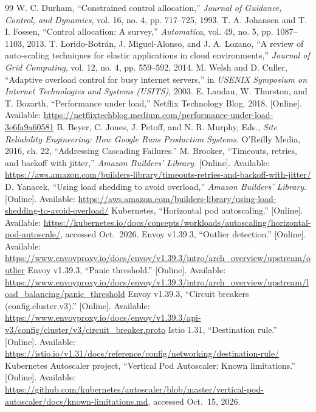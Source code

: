 \documentclass[conference]{IEEEtran}
\begin{document}
\begin{thebibliography}{99}
 W. C. Durham, ``Constrained control allocation,'' \emph{Journal of Guidance, Control, and Dynamics}, vol. 16, no. 4, pp. 717--725, 1993.
 T. A. Johansen and T. I. Fossen, ``Control allocation: A survey,'' \emph{Automatica}, vol. 49, no. 5, pp. 1087--1103, 2013.
 T. Lorido-Botr\'an, J. Miguel-Alonso, and J. A. Lozano, ``A review of auto-scaling techniques for elastic applications in cloud environments,'' \emph{Journal of Grid Computing}, vol. 12, no. 4, pp. 559--592, 2014.
 M. Welsh and D. Culler, ``Adaptive overload control for busy internet servers,'' in \emph{USENIX Symposium on Internet Technologies and Systems (USITS)}, 2003.
 E. Landau, W. Thurston, and T. Bozarth, ``Performance under load,'' Netflix Technology Blog, 2018. [Online]. Available: \url{https://netflixtechblog.medium.com/performance-under-load-3e6fa9a60581}
 B. Beyer, C. Jones, J. Petoff, and N. R. Murphy, Eds., \emph{Site Reliability Engineering: How Google Runs Production Systems}. O'Reilly Media, 2016, ch. 22, ``Addressing Cascading Failures.''
 M. Brooker, ``Timeouts, retries, and backoff with jitter,'' \emph{Amazon Builders' Library}. [Online]. Available: \url{https://aws.amazon.com/builders-library/timeouts-retries-and-backoff-with-jitter/}
 D. Yanacek, ``Using load shedding to avoid overload,'' \emph{Amazon Builders' Library}. [Online]. Available: \url{https://aws.amazon.com/builders-library/using-load-shedding-to-avoid-overload/}
 Kubernetes, ``Horizontal pod autoscaling.'' [Online]. Available: \url{https://kubernetes.io/docs/concepts/workloads/autoscaling/horizontal-pod-autoscale/}, accessed Oct.\ 2026.
 Envoy v1.39.3, ``Outlier detection.'' [Online]. Available: \url{https://www.envoyproxy.io/docs/envoy/v1.39.3/intro/arch_overview/upstream/outlier}
 Envoy v1.39.3, ``Panic threshold.'' [Online]. Available: \url{https://www.envoyproxy.io/docs/envoy/v1.39.3/intro/arch_overview/upstream/load_balancing/panic_threshold}
 Envoy v1.39.3, ``Circuit breakers (config.cluster.v3).'' [Online]. Available: \url{https://www.envoyproxy.io/docs/envoy/v1.39.3/api-v3/config/cluster/v3/circuit_breaker.proto}
 Istio 1.31, ``Destination rule.'' [Online]. Available: \url{https://istio.io/v1.31/docs/reference/config/networking/destination-rule/}
 Kubernetes Autoscaler project, ``Vertical Pod Autoscaler: Known limitations.'' [Online]. Available: \url{https://github.com/kubernetes/autoscaler/blob/master/vertical-pod-autoscaler/docs/known-limitations.md}, accessed Oct.\ 15, 2026.

\end{thebibliography}
\end{document}
